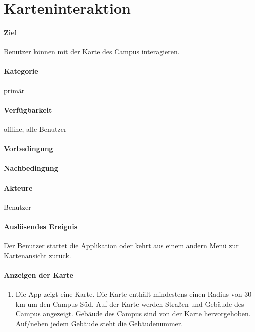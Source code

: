 \section{Karteninteraktion}
\paragraph{Ziel}
Benutzer können mit der Karte des Campus interagieren.
\paragraph{Kategorie}
primär
\paragraph{Verfügbarkeit}
offline, alle Benutzer
\paragraph{Vorbedingung}

\paragraph{Nachbedingung}

\paragraph{Akteure}
Benutzer
\paragraph{Auslösendes Ereignis}
Der Benutzer startet die Applikation oder kehrt aus einem andern Menü zur Kartenansicht zurück.
\paragraph{Anzeigen der Karte}
\begin{enumerate}
    \item Die App zeigt eine Karte. Die Karte enthält mindestens einen Radius von 30 km um den Campus Süd. Auf der Karte werden Straßen und Gebäude des Campus angezeigt. Gebäude des Campus sind von der Karte hervorgehoben. Auf/neben jedem Gebäude steht die Gebäudenummer.
\end{enumerate}
